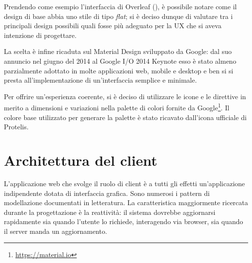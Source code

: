       Prendendo come esempio l'interfaccia di Overleaf (), è possibile notare come il design di base abbia uno stile di tipo \emph{flat};
      si è deciso dunque di valutare tra i principali design possibili quali fosse più adeguato per la UX che si aveva intenzione di progettare.

      La scelta è infine ricaduta sul Material Design sviluppato da Google:
      dal suo annuncio nel giugno del 2014 al Google I/O 2014 Keynote esso è stato almeno parzialmente adottato in molte applicazioni web, mobile e desktop
      e ben si si presta all'implementazione di un'interfaccia semplice e minimale. %

      Per offrire un'esperienza coerente, si è deciso di utilizzare le icone e le direttive in merito a dimensioni e variazioni nella palette di colori fornite da Google\footnote{\url{https://material.io}}.
      Il colore base utilizzato per generare la palette è stato ricavato dall'icona ufficiale di Protelis. %

  \section{Architettura del client}\label{sec:arch:client}

    L'applicazione web che svolge il ruolo di client è a tutti gli effetti un'applicazione indipendente dotata di interfaccia grafica.
    Sono numerosi i pattern di modellazione documentati in letteratura.
    La caratteristica maggiormente ricercata durante la progettazione è la reattività:
    il sistema dovrebbe aggiornarsi rapidamente sia quando l'utente lo richiede, interagendo via browser, sia quando il server manda un aggiornamento.



